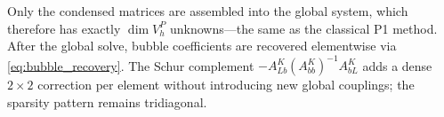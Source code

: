 \documentclass[11pt]{article}
\newcommand{\Vp}{V_h^P}
\theoremstyle{remark}
\begin{document}
Only the condensed matrices are assembled into the global system, which therefore has exactly $\dim \Vp$ unknowns---the same as the classical P1 method. After the global solve, bubble coefficients are recovered elementwise via \eqref{eq:bubble_recovery}. The Schur complement $-A_{Lb}^K(A_{bb}^K)^{-1}A_{bL}^K$ adds a dense $2 \times 2$ correction per element without introducing new global couplings; the sparsity pattern remains tridiagonal.



\end{document}
